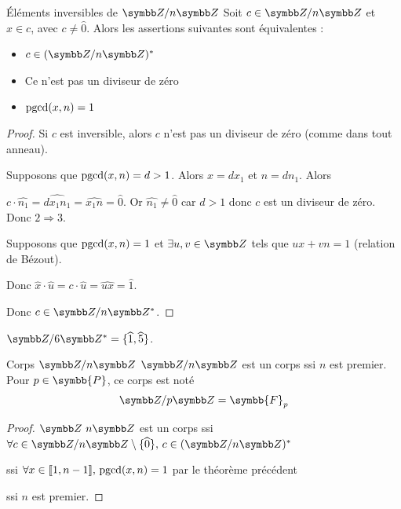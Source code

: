 \begin{theoreme}{Éléments inversibles de $\Z / n \Z$}{}
    Soit $c \in \Z/n \Z$ et $x \in c$, avec $c \neq \hat 0$. 
    Alors les assertions suivantes sont équivalentes : 
    
    \begin{itemize}
        \item $c \in (\Z / n \Z)^*$
        \item Ce n'est pas un diviseur de zéro
        \item $\operatorname{pgcd}(x, n) = 1$ 
    \end{itemize}
\end{theoreme}


\begin{proof}
    Si $c$ est inversible, alors $c$ n'est pas un diviseur de zéro (comme dans tout anneau).

    Supposons que $\operatorname{pgcd}(x, n) = d > 1$. Alors $x = d x_1$ et $n = d n_1$. Alors 

    $c \cdot \widehat{n_1} = \widehat{dx_1n_1} = \widehat{x_1n} = \widehat{0}$. 
    Or $\widehat {n_1} \neq \widehat{0}$ car $d > 1$ donc $c$ est un diviseur de zéro.
    Donc $2 \Rightarrow 3$.

    \avspace Supposons que $\operatorname{pgcd}(x, n) = 1$ et $\exists u, v \in \Z$ tels que $ux + vn = 1$ (relation de Bézout).

    Donc $\widehat x \cdot \widehat u = c \cdot \widehat u = \widehat{ux} = \widehat{1}$.

    Donc $c \in \Z/n\Z^*$.
\end{proof}

\begin{exemple}
    $\Z/6\Z^* = \{\widehat{1}, \widehat{5}\}$.
\end{exemple}

\begin{theoreme}{Corps $\Z/n\Z$}{}
    $\Z/n\Z$ est un corps ssi $n$ est premier. Pour $p \in \symbb{P}$, ce corps est noté 
    \[\Z/p\Z = \symbb{F}_p\]
\end{theoreme}

\begin{proof}
    $\Z \ n \Z$ est un corps ssi $\forall c \in \Z / n \Z \setminus \{\widehat{0}\}, \, c \in (\Z / n \Z)^*$

    ssi $\forall x \in [\![1, n - 1]\!], \, \operatorname{pgcd}(x, n) = 1$ par le théorème précédent

    ssi $n$ est premier.
\end{proof}


